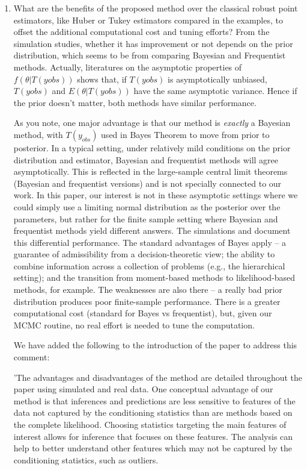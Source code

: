 \documentclass{article}
\newcommand{\response}[1]{{\color{blue}#1}}
\begin{document}
\begin{enumerate}
\item What are the benefits of the proposed method over the classical robust point estimators, like Huber or Tukey estimators compared in the examples, to offset the additional computational cost and tuning efforts? From the simulation studies, whether it has improvement or not depends on the prior distribution, which seems to be from comparing Bayesian and Frequentist methods. Actually, literatures on the asymptotic properties of $f(\theta|T(yobs))$ shows that, if $T(yobs)$ is asymptotically unbiased, $T (yobs)$ and $E(\theta | T (yobs))$ have the same asymptotic variance. Hence if the prior doesn't matter, both methods have similar performance.

\response{As you note, one major advantage is that our method is {\em exactly} a Bayesian method, with $T(y_{obs})$ used in Bayes Theorem to move from prior to posterior.  In a typical setting, under relatively mild conditions on the prior distribution and estimator, Bayesian and frequentist methods will agree asymptotically.  This is reflected in the large-sample central limit theorems (Bayesian and frequentist versions) and is not specially connected to our work.  In this paper, our interest is not in these asymptotic settings where we could simply use a limiting normal distribution as the posterior over the parameters, but rather for the finite sample setting where Bayesian and frequentist methods yield different answers.  The simulations and document this differential performance.  The standard advantages of Bayes apply -- a guarantee of admissibility from a decision-theoretic view; the ability to combine information across a collection of problems (e.g., the hierarchical setting); and the transition from moment-based methods to likelihood-based methods, for example.  The weaknesses are also there -- a really bad prior distribution produces poor finite-sample performance.  There is a greater computational cost (standard for Bayes vs frequentist), but, given our MCMC routine, no real effort is needed to tune the computation.}  

\response{We have added the following to the introduction of the paper to address this comment:}

\response{'The advantages and disadvantages of the method are detailed throughout the paper using simulated and real data. One conceptual advantage of our method is that inferences and predictions are less sensitive to features of the data not captured by
the conditioning statistics than are methods based on the complete likelihood. Choosing statistics targeting the main features of interest allows for inference that focuses on these features. The analysis can help to better understand other features which may not be captured by the conditioning statistics, such as outliers.} 


\end{enumerate}
\end{document}
